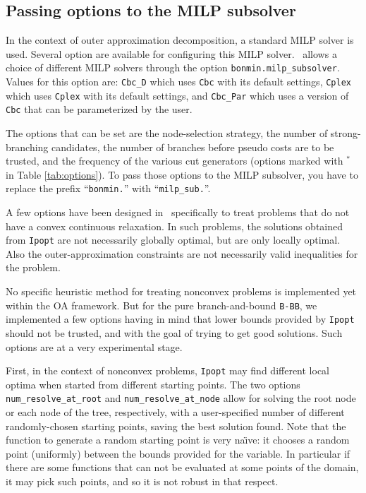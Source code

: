 \subsection{Passing options to the MILP subsolver}
\label{sec:milp_opt}
In the context of outer approximation decomposition, a standard MILP solver is used.
Several option are available for configuring this MILP solver.
\Bonmin\ allows a choice of different MILP solvers through the option
{\tt bonmin.milp\_subsolver}. Values for this option are: {\tt Cbc\_D} which uses {\tt Cbc} with its
default settings, {\tt Cplex} which uses {\tt Cplex} with its default settings, and
{\tt Cbc\_Par} which uses a version of {\tt Cbc} that can be parameterized by the user.

The options that can be set are the node-selection strategy, the number of strong-branching candidates,
the number of branches before pseudo costs are to be trusted, and the frequency of the various cut generators
(options marked with $^*$ in Table \ref{tab:options}). To pass those options to the MILP subsolver, you have
to replace the prefix ``{\tt bonmin.}'' with ``{\tt milp\_sub.}''.


\label{sec:non_convex}
A few options have been designed in \Bonmin\ specifically to treat
problems that do not have a convex continuous relaxation.
In such problems, the solutions obtained from {\tt Ipopt} are
not necessarily globally optimal, but are only locally optimal. Also the outer-approximation
constraints are not necessarily valid inequalities for the problem.

No specific heuristic method for treating nonconvex problems is implemented
yet within the OA framework.
But for the pure branch-and-bound {\tt B-BB}, we implemented a few options having
in mind that lower bounds provided by {\tt Ipopt} should not be trusted, and with the goal of
trying to get good solutions. Such options are at a very experimental stage.

First, in the context of nonconvex problems, {\tt Ipopt} may find different local optima when started
from different starting points. The two options {\tt num\_re\-solve\_at\_root} and {\tt num\_resolve\_at\_node}
allow for solving the root node or each node of the tree, respectively, with a user-specified
number of different randomly-chosen
starting points, saving the best solution found. Note that the function to generate a random starting point
is very na\"{\i}ve: it chooses a random point (uniformly) between the bounds provided for the variable.
In particular if there are some functions
that can not be evaluated at some points of the domain, it may pick such points,
 and so it is not robust in that respect.

